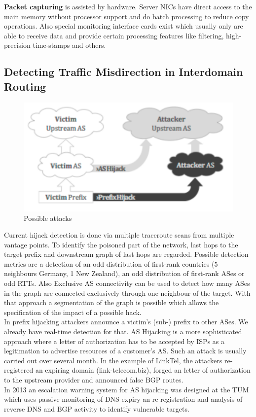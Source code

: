 \textbf{Packet capturing} is assisted by hardware.
Server NICs have direct access to the main memory without processor support and do batch processing to reduce copy operations.
Also special monitoring interface cards exist which usually only are able to receive data and provide certain processing features like filtering, high-precision time-stamps and others.

\subsection{Detecting Traffic Misdirection in Interdomain Routing}
\begin{figure}[H]
  \centering
  \includegraphics[width=.6\textwidth]{figures/as_and_prefix_hijacking.png}
  \caption{Possible attacks}\label{fig:fig:as_and_prefix_hijacking}
\end{figure}

Current hijack detection is done via multiple traceroute scans from multiple vantage points.
To identify the poisoned part of the network, last hops to the target prefix and downstream graph of last hops are regarded.
Possible detection metrics are a detection of an odd distribution of first-rank countries (5 neighbours Germany, 1 New Zealand), an odd distribution of first-rank ASes or odd RTTs.
Also Exclusive AS connectivity can be used to detect how many ASes in the graph are connected exclusively through one neighbour of the target.
With that approach a segmentation of the graph is possible which allows the specification of the impact of a possible hack.\\

In prefix hijacking attackers announce a victim's (sub-) prefix to other ASes.
We already have real-time detection for that.
AS Hijacking is a more sophisticated approach where a letter of authorization has to be accepted by ISPs as a legitimation to advertise resources of a customer's AS.
Such an attack is usually carried out over several month.
In the example of LinkTel, the attackers re-registered an expiring domain (link-telecom.biz), forged an letter of authorization to the upstream provider and announced false BGP routes.\\
In 2013 an escalation warning system for AS hijacking was designed at the TUM which uses passive monitoring of DNS expiry an re-registration and analysis of reverse DNS and BGP activity to identify vulnerable targets.
